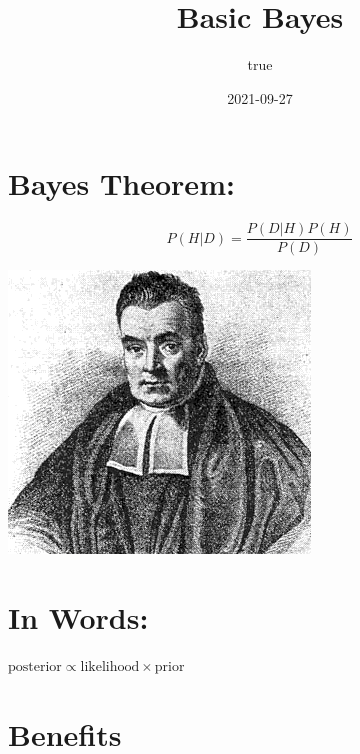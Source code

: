 \documentclass[
]{article}
\title{Basic Bayes}
\author{true}
\date{2021-09-27}
\begin{document}
\maketitle

{
\setcounter{tocdepth}{2}
\tableofcontents
}
\hypertarget{bayes-theorem}{%
\section{Bayes Theorem:}\label{bayes-theorem}}

\[P(H|D) = \frac{P(D|H) P(H)}{P(D)}\]

\includegraphics{../Thomas_Bayes.gif}

\hypertarget{in-words}{%
\section{In Words:}\label{in-words}}

\(\text{posterior} \propto \text{likelihood} \times \text{prior}\)

\hypertarget{benefits}{%
\section{Benefits}\label{benefits}}
\end{document}
